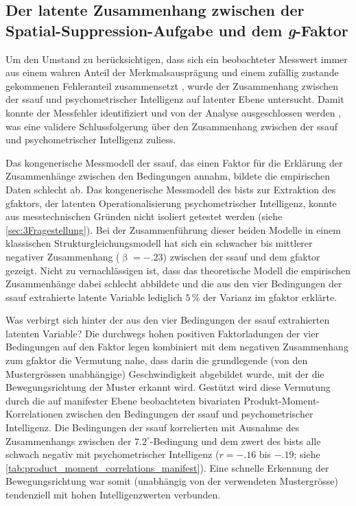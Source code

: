 \documentclass[11pt, twoside, a4paper]{book}		%
\begin{document}
\subsection{Der latente Zusammenhang zwischen der Spa\-tial-Sup\-pres\-sion-Auf\-gabe und dem \textit{g}-Faktor}

Um den Umstand zu berücksichtigen, dass sich ein beobachteter Messwert immer aus einem wahren Anteil der Merkmalsausprägung und einem zufällig zustande gekommenen Fehleranteil zusammensetzt \citep{Moosbrugger2007}, wurde der Zusammenhang zwischen der \gls{ssauf} und psychometrischer Intelligenz auf latenter Ebene untersucht. Damit konnte der Messfehler identifiziert und von der Analyse ausgeschlossen werden \citep[S. 9]{Kline2011}, was eine validere Schlussfolgerung über den Zusammenhang zwischen der \gls{ssauf} und psychometrischer Intelligenz zuliess.

Das kongenerische Messmodell der \gls{ssauf}, das einen Faktor für die Erklärung der Zusammenhänge zwischen den Bedingungen annahm, bildete die empirischen Daten schlecht ab. Das kongenerische Messmodell des \gls{bist}s zur Extraktion des \gls{gfaktor}s, der latenten Operationalisierung psychometrischer Intelligenz, konnte aus messtechnischen Gründen nicht isoliert getestet werden (siehe \autoref{sec:3Fragestellung}). Bei der Zusammenführung dieser beiden Modelle in einem klassischen Strukturgleichungsmodell hat sich ein schwacher bis mittlerer negativer Zusammenhang ($\upbeta=-.23$) zwischen der \gls{ssauf} und dem \gls{gfaktor} gezeigt. Nicht zu vernachlässigen ist, dass das theoretische Modell die empirischen Zusammenhänge dabei schlecht abbildete und die aus den vier Bedingungen der \gls{ssauf} extrahierte latente Variable lediglich $5\,\%$ der Varianz im \gls{gfaktor} erklärte.

Was verbirgt sich hinter der aus den vier Bedingungen der \gls{ssauf} extrahierten latenten Variable? Die durchwegs hohen positiven Faktorladungen der vier Bedingungen auf den Faktor legen kombiniert mit dem negativen Zusammenhang zum \gls{gfaktor} die Vermutung nahe, dass darin die grundlegende (von den Mustergrössen unabhängige) Geschwindigkeit abgebildet wurde, mit der die Bewegungsrichtung der Muster erkannt wird. 
Gestützt wird diese Vermutung durch die auf manifester Ebene beobachteten bivariaten Produkt-Moment-Korrelationen zwischen den Bedingungen der \gls{ssauf} und psychometrischer Intelligenz. Die Bedingungen der \gls{ssauf} korrelierten mit Ausnahme des Zusammenhangs zwischen der $7.2^{\circ}$-Bedingung und dem \gls{zwert} des \gls{bist}s alle schwach negativ mit psychometrischer Intelligenz ($r=-.16$ bis $-.19$; siehe \autoref{tab:product_moment_correlations_manifest}). Eine schnelle Erkennung der Bewegungsrichtung war somit (unabhängig von der verwendeten Mustergrösse) tendenziell mit hohen Intelligenzwerten verbunden. 
\end{document}
